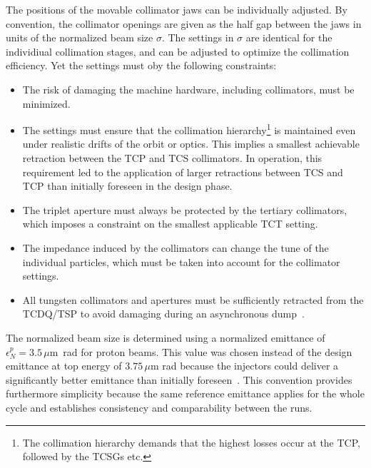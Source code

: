 The positions of the movable collimator jaws can be individually adjusted. By convention, the collimator openings are given as the half gap between the jaws in units of the normalized beam size $\sigma$.  The settings in $\sigma$ are identical for the individiual collimation stages, and can be adjusted to optimize the collimation efficiency. Yet the settings must oby the following constraints:
% 
\begin{itemize}
  \item The risk of damaging the machine hardware, including collimators, must be minimized.
  \item The settings must ensure that the collimation hierarchy\footnote{The collimation hierarchy demands that the highest losses occur at the TCP, followed by the TCSGs etc.} is maintained even under realistic drifts of the orbit or optics. This implies a smallest achievable retraction between the TCP and TCS collimators. In operation, this requirement led to the application of larger retractions between TCS and TCP than initially foreseen in the design phase.
  \item The triplet aperture must always be protected by the tertiary collimators, which imposes a constraint on the smallest applicable TCT setting. 
  \item The impedance induced by the collimators can change the tune of the individual particles, which must be taken into account for the collimator settings.
  \item All tungsten collimators and apertures must be sufficiently retracted from the TCDQ/TSP to avoid damaging during an asynchronous dump~\cite{projectnote293}.
\end{itemize}
%
 The normalized beam size is determined using a normalized emittance of \mbox{$\epsilon_N^p = 3.5\,\mu$m rad} for proton beams. This value was chosen instead of the design emittance at top energy of $3.75\,\mu$m rad because the injectors could deliver a significantly better emittance than initially foreseen~\cite{abc}. This convention provides furthermore simplicity because the same reference emittance applies for the whole cycle and establishes consistency and comparability between the runs. 

